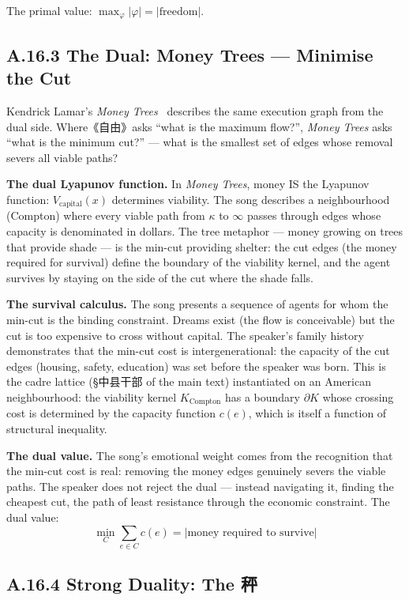\documentclass[11pt,a4paper]{article}
\theoremstyle{definition}
\theoremstyle{remark}
\begin{document}
The primal value: $\max_\varphi |\varphi| = |\text{freedom}|$.


\subsection{A.16.3 The Dual: Money Trees --- Minimise the Cut}

Kendrick Lamar's \emph{Money Trees}~\cite{lamar2012} describes the same execution graph from the dual side. Where《自由》asks ``what is the maximum flow?'', \emph{Money Trees} asks ``what is the minimum cut?'' --- what is the smallest set of edges whose removal severs all viable paths?

\textbf{The dual Lyapunov function.} In \emph{Money Trees}, money IS the Lyapunov function: $V_{\text{capital}}(x)$ determines viability. The song describes a neighbourhood (Compton) where every viable path from $\kappa$ to $\infty$ passes through edges whose capacity is denominated in dollars. The tree metaphor --- money growing on trees that provide shade --- is the min-cut providing shelter: the cut edges (the money required for survival) define the boundary of the viability kernel, and the agent survives by staying on the side of the cut where the shade falls.

\textbf{The survival calculus.} The song presents a sequence of agents for whom the min-cut is the binding constraint. Dreams exist (the flow is conceivable) but the cut is too expensive to cross without capital. The speaker's family history demonstrates that the min-cut cost is intergenerational: the capacity of the cut edges (housing, safety, education) was set before the speaker was born. This is the cadre lattice (\S 中县干部 of the main text) instantiated on an American neighbourhood: the viability kernel $K_{\text{Compton}}$ has a boundary $\partial K$ whose crossing cost is determined by the capacity function $c(e)$, which is itself a function of structural inequality.

\textbf{The dual value.} The song's emotional weight comes from the recognition that the min-cut cost is real: removing the money edges genuinely severs the viable paths. The speaker does not reject the dual --- instead navigating it, finding the cheapest cut, the path of least resistance through the economic constraint. The dual value:
\[
  \min_C \sum_{e \in C} c(e) = |\text{money required to survive}|
\]


\subsection{A.16.4 Strong Duality: The 秤}
\end{document}

